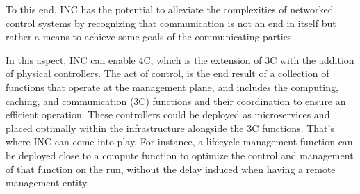 To this end, INC has the potential to alleviate the complexities of networked control systems by recognizing that communication is not an end in itself but rather a means to achieve some goals of the communicating parties. 
%
%

In this aspect, INC can enable 4C, which is the extension of 3C with the addition of physical controllers. The act of control, is the end result of a collection of functions that operate at the management plane, and includes the computing, caching, and communication (3C) functions and their coordination to ensure an efficient operation.  These controllers could be deployed as microservices and placed optimally within the infrastructure alongside the 3C functions. That's where INC can come into play. For instance, a lifecycle management function can be deployed close to a compute function to optimize the control and management of that function on the run, without the delay induced when having a remote management entity. 



\label{INC_business}
 \noindent 
 
